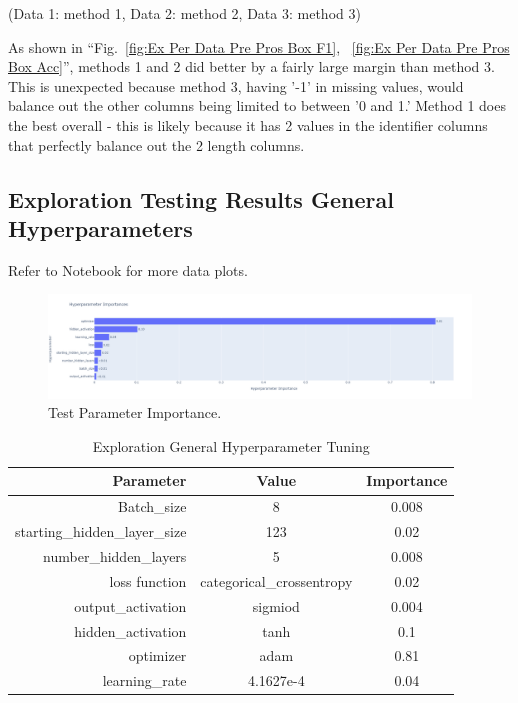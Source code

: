 \documentclass[conference]{IEEEtran}
\begin{document}
\FloatBarrier

(Data 1: method 1, Data 2: method 2, Data 3: method 3)

As shown in ``Fig.~\ref{fig:Ex Per Data Pre Pros Box F1}, ~\ref{fig:Ex Per Data Pre Pros Box Acc}'', methods 1 and 2 did better by a fairly large margin than method 3. This is unexpected because method 3, having '-1' in missing values, would balance out the other columns being limited to between '0 and 1.' Method 1 does the best overall - this is likely because it has 2 values in the identifier columns that perfectly balance out the 2 length columns. 

\newpage

\subsection{Exploration Testing Results General Hyperparameters}

Refer to Notebook for more data plots.\cite{b2}

\begin{figure}[htbp]
\centerline{\includegraphics[width=\columnwidth]{Ex Gen Hyp Opt Res Imp.png}}
\caption{Test Parameter Importance.}
\label{fig:Ex Gen Hyp Opt Res Imp}
\end{figure}

\FloatBarrier

\begin{table}[h]
    \centering
    \begin{tabular}{|r|c|c|}
        \hline
        Parameter& Value &Importance\\ \hline
        Batch\_size& 8 &0.008\\ \hline
        starting\_hidden\_layer\_size& 123&0.02\\ \hline
        number\_hidden\_layers& 5&0.008\\ \hline
        loss function&           categorical\_crossentropy&0.02\\ \hline
 output\_activation& sigmiod&0.004\\\hline
 hidden\_activation& tanh&0.1\\\hline
 optimizer& adam&0.81\\\hline
 learning\_rate& 4.1627e-4&0.04\\\hline
    \end{tabular}
    \caption{Exploration General Hyperparameter Tuning}
    \label{tab:ExGenHyperTuning}
\end{table}
\end{document}
